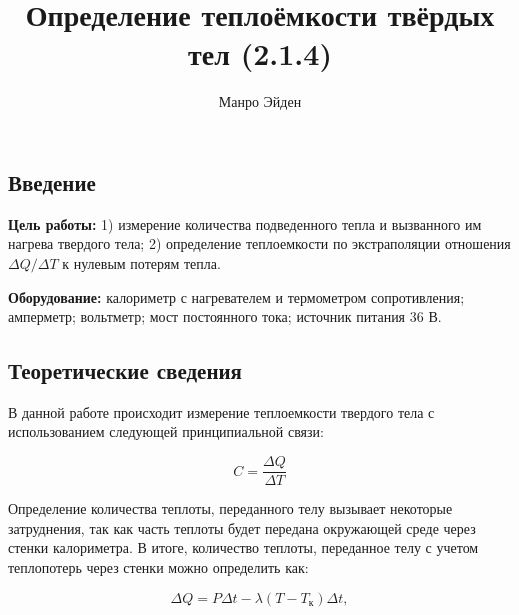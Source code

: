 \documentclass[a4paper, 12pt]{article}
\title{\textbf{Определение теплоёмкости твёрдых тел (2.1.4)}}
\author{Манро Эйден}
\date{}
\begin{document}
\maketitle

\begin{center}
    \section*{Введение}
\end{center}

    \textbf{Цель работы:} 1) измерение количества подведенного тепла и вызванного им нагрева твердого тела; 2) определение теплоемкости по экстраполяции отношения $\Delta Q / \Delta T$ к нулевым потерям тепла.

    \bigskip

    \textbf{Оборудование:} калориметр с нагревателем и термометром сопротивления; амперметр; вольтметр; мост постоянного тока; источник питания 36 В.

    \bigskip

\begin{center}
    \section*{Теоретические сведения}
\end{center}

В данной работе происходит измерение теплоемкости твердого тела с использованием следующей принципиальной связи:
	
\bigskip

\begin{equation} \label{first_eq_of_thermal_capacity}
	C = \frac{\Delta Q}{\Delta T}
\end{equation} 

\bigskip

Определение количества теплоты, переданного телу вызывает некоторые затруднения, так как часть теплоты будет передана окружающей среде через стенки калориметра. В итоге, количество теплоты, переданное телу с учетом теплопотерь через стенки можно определить как:

\bigskip

\begin{equation} \label{termal_with_heat_lossing}
	\Delta Q = P\Delta t - \lambda \left( T - T_{\text{к}} \right) \Delta t,

\end{equation}

\bigskip
\end{document}
